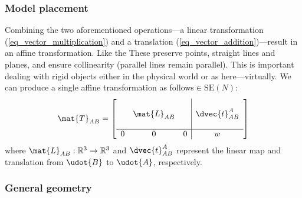 \subsubsection{Model placement}

Combining the two aforementioned operations---a linear transformation (\ref{eq_vector_multiplication}) and a translation (\ref{eq_vector_addition})---result in an affine transformation. Like the These preserve points, straight lines and planes, and ensure collinearity (parallel lines remain parallel). This is important dealing with rigid objects either in the physical world or as here---virtually. We can produce a single affine transformation as follows$\in\mathrm{SE}(N)$:
%
\begin{align}\label{eq:T_definition}
\mat{T}_{AB}
= \left[\begin{array}{c c c | c}
& & &   \\
& \mat{L}_{AB}  & & \dvec{t}_{AB}^A \\
& & &  \\\hline
 0 &  0  &  0  &  w
\end{array}\right] 
\end{align}
where $\mat{L}_{AB}: \mathbb{R}^3 \to \mathbb{R}^3$ and $\dvec{t}_{AB}^A$ represent the linear map and translation from $\udot{B}$ to $\udot{A}$, respectively.




\subsubsection{General geometry}


